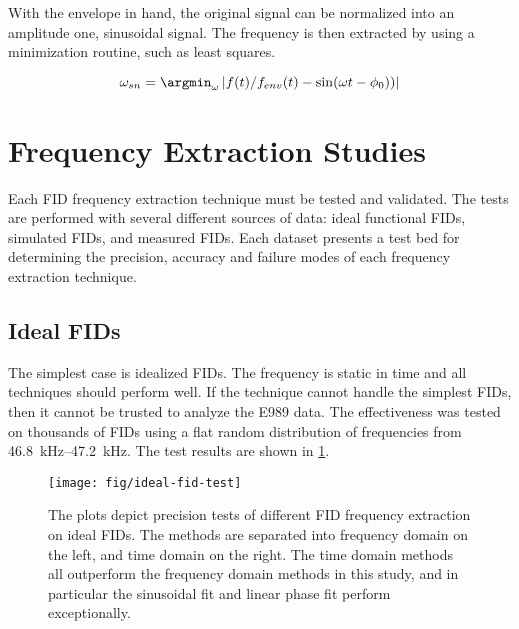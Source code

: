 \noindent 
With the envelope in hand, the original signal can be normalized into an amplitude one, sinusoidal signal.  The frequency is then extracted by using a minimization routine, such as least squares.

\begin{equation}
\label{eqn:freq-sn}
\omega_{sn} = \argmin_\omega \; \\
\left| f(t) / f_{env}(t) - \sin(\omega t - \phi_0)) \right|
\end{equation}

\section{Frequency Extraction Studies}

Each FID frequency extraction technique must be tested and validated.  The tests are performed with several different sources of data: ideal functional FIDs, simulated FIDs, and measured FIDs.  Each dataset presents a test bed for determining the precision, accuracy and failure modes of each frequency extraction technique.

\subsection{Ideal FIDs}
The simplest case is idealized FIDs. The frequency is static in time and all techniques should perform well.  If the technique cannot handle the simplest FIDs, then it cannot be trusted to analyze the E989 data.  The effectiveness was tested on thousands of FIDs using a flat random distribution of frequencies from \SIrange{46.8}{47.2}{\kHz}.  The test results are shown in \ref{fig:fid-ideal-freq-extraction}.

\begin{figure}
\label{fig:fid-ideal-freq-extraction}
\centering
\texttt{[image: fig/ideal-fid-test]}
\caption{The plots depict precision tests of different FID frequency extraction on ideal FIDs.  The methods are separated into frequency domain on the left, and time domain on the right.  The time domain methods all outperform the frequency domain methods in this study, and in particular the sinusoidal fit and linear phase fit perform exceptionally.}
\end{figure}

